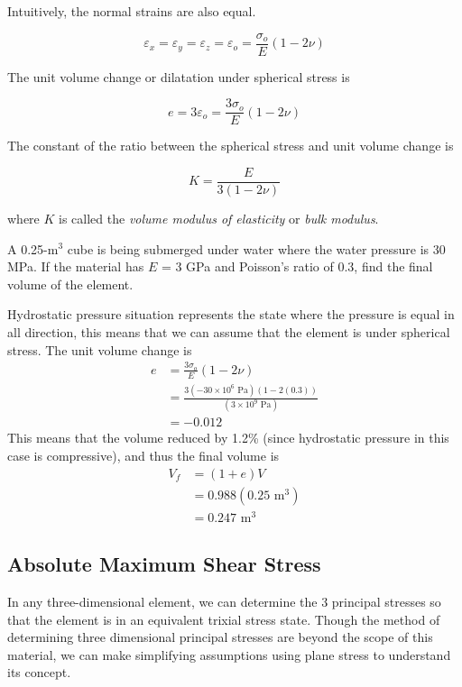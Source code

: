 \documentclass[
fontsize=10pt,
a4paper,
twosides=false,
open=any,
svgnames,
]{kaobook} %
\begin{document}
Intuitively, the normal strains are also equal.

\[\varepsilon _x = \varepsilon _y = \varepsilon _z = \varepsilon _o = \frac{\sigma _o}{E}(1 - 2\nu )\]

The unit volume change or dilatation under spherical stress is

\begin{equation}
  e = 3\varepsilon_o = \frac{3\sigma_o}{E}(1 - 2\nu )
\end{equation}

The constant of the ratio between the spherical stress and unit volume change is

\begin{equation}
  K = \frac{E}{3(1 - 2\nu )}
\end{equation}

where $K$ is called the \emph{volume modulus of elasticity} or \emph{bulk modulus}.

\begin{example}
A 0.25-m$^3$ cube is being submerged under water where the water pressure is 30 MPa. If the material has $E$ = 3 GPa and Poisson’s ratio of 0.3, find the final volume of the element.

Hydrostatic pressure situation represents the state where the pressure is equal in all direction, this means that we can assume that the element is under spherical stress. The unit volume change is
\begin{align*}
  e &= \frac{3\sigma_o}{E}(1 - 2\nu ) \\ 
    &= \frac{3(-30 \times 10^6 \text{ Pa})(1 - 2(0.3))}{(3 \times 10^9 \text{ Pa})} \\ 
    &= -0.012 
\end{align*}	
This means that the volume reduced by 1.2\% (since hydrostatic pressure in this case is compressive), and thus the final volume is
\begin{align*}
  V_f &= (1 + e)V \\ 
      &= 0.988(0.25 \text{ m}^3) \\ 
      &= 0.247 \text{ m}^3
\end{align*}

\end{example}

\subsection{Absolute Maximum Shear Stress}

In any three-dimensional element, we can determine the 3 principal stresses so that the element is in an equivalent trixial stress state. Though the method of determining three dimensional principal stresses are beyond the scope of this material, we can make simplifying assumptions using plane stress to understand its concept.
\end{document}
